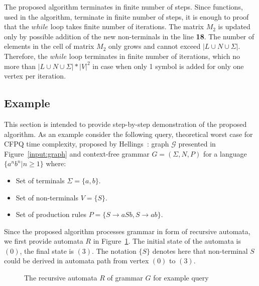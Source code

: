 The proposed algorithm terminates in finite number of steps. Since functions, used in the algorithm, terminate in finite number of steps, it is enough to proof that the $while$ loop takes finite number of iterations. The matrix $M_2$ is updated only by possible addition of the new non-terminals in the line \textbf{18}. The number of elements in the cell of matrix $M_2$ only grows and cannot exceed $|L \cup N \cup \Sigma|$. Therefore, the $while$ loop terminates in finite number of iterations, which no more than $|L \cup N \cup \Sigma| * |V|^2$ in case when only 1 symbol is added for only one vertex per iteration.

\subsection{Example}

This section is intended to provide step-by-step demonstration of the proposed algorithm. As an example consider the following query, theoretical worst case for CFPQ time complexity, proposed by Hellings~\cite{Hellings}: graph $\mathcal{G}$ presented in Figure~\ref{input:graph} and  context-free grammar $G=(\Sigma,N,P)$ for a language $\{a^n b^n | n \geq 1\}$ where:

\begin{itemize}
    \item Set of terminals $\Sigma = \{a, b\}$.
    \item Set of non-terminals $V = \{ S \}$.
    \item Set of production rules $P = \{ S \to a S b, S \to a b\}$.
\end{itemize}

Since the proposed algorithm processes grammar in form of recursive automata, we first provide automata $R$ in Figure~\ref{input:automata}. The initial state of the automata is $(0)$, the final state is $(3)$. The notation $\{S\}$ denotes here that non-terminal $S$ could be derived in automata path from vertex $(0)$ to $(3)$.

\begin{figure}[h]
    \centering
    \caption{The recursive automata $R$ of grammar $G$ for example query}
    \label{input:automata}
\end{figure}

